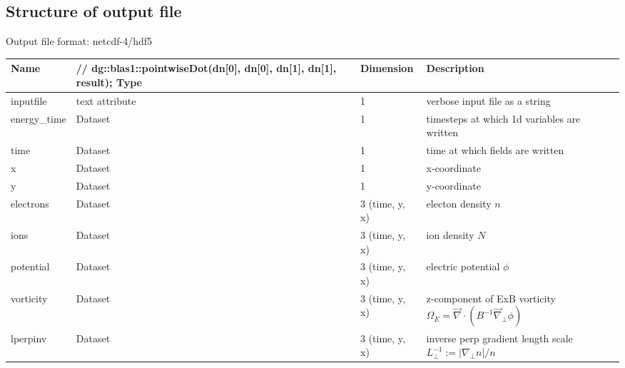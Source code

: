 \subsection{Structure of output file}
Output file format: netcdf-4/hdf5
%
\begin{longtable}{lll>{\RaggedRight}p{7cm}}
\toprule
\rowcolor{gray!50}\textbf{Name} & //             dg::blas1::pointwiseDot(dn[0], dn[0], dn[1], dn[1], result);
 \textbf{Type} & \textbf{Dimension} & \textbf{Description}  \\ \midrule
inputfile  &             text attribute & 1 & verbose input file as a string \\
energy\_time             & Dataset & 1 & timesteps at which 1d variables are written \\
time                     & Dataset & 1 & time at which fields are written \\
x                        & Dataset & 1 & x-coordinate  \\
y                        & Dataset & 1 & y-coordinate \\
electrons                & Dataset & 3 (time, y, x) & electon density $n$ \\
ions                     & Dataset & 3 (time, y, x) & ion density $N$ \\
potential                & Dataset & 3 (time, y, x) & electric potential $\phi$  \\
vorticity                & Dataset & 3 (time, y, x) & z-component of ExB vorticity  $\Omega_E = \vec{\nabla}\cdot (B^{-1} \vec{\nabla}_{\perp}\phi)$  \\
lperpinv                 & Dataset & 3 (time, y, x) & inverse perp gradient length scale   $L_\perp^{-1} := |\nabla_\perp n| / n$ \\
\bottomrule
\end{longtable}




